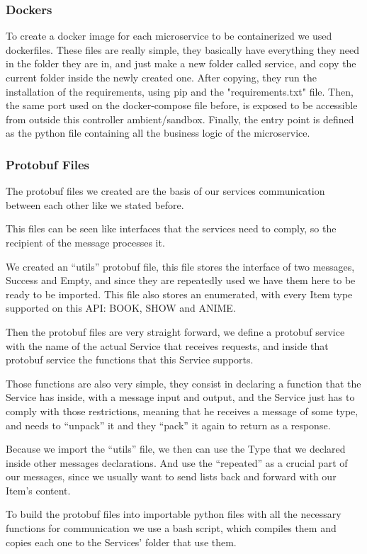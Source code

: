 \documentclass[oneside]{article}
\newcommand*\fpar{\hspace{1ex}}
\begin{document}
      \subsubsection{Dockers}
      \fpar To create a docker image for each microservice to be containerized we used dockerfiles. These files are really simple, they basically have everything they need in the folder they are in, and just make a new folder called service, and copy the current folder inside the newly created one. After copying, they run the installation of the requirements, using pip and the "requirements.txt" file. Then, the same port used on the docker-compose file before, is exposed to be accessible from outside this controller ambient/sandbox. Finally, the entry point is defined as the python file containing all the business logic of the microservice.

      \subsubsection{Protobuf Files}
      \fpar The protobuf files we created are the basis of our services communication between each other like we stated before.
      \par This files can be seen like interfaces that the services need to comply, so the recipient of the message processes it.
      \par We created an “utils” protobuf file, this file stores the interface of two messages, Success and Empty, and since they are repeatedly used we have them here to be ready to be imported. This file also stores an enumerated, with every Item type supported on this API: BOOK, SHOW and ANIME.
      \par Then the protobuf files are very straight forward, we define a protobuf service with the name of the actual Service that receives requests, and inside that protobuf service the functions that this Service supports.
      \par Those functions are also very simple, they consist in declaring a function that the Service has inside, with a message input and output, and the Service just has to comply with those restrictions, meaning that he receives a message of some type, and needs to “unpack” it and they “pack” it again to return as a response.
      \par Because we import the “utils” file, we then can use the Type that we declared inside other messages declarations. And use the “repeated” as a crucial part of our messages, since we usually want to send lists back and forward with our Item's content.
      \par To build the protobuf files into importable python files with all the necessary functions for communication we use a bash script, which compiles them and copies each one to the Services' folder that use them.
\end{document}
